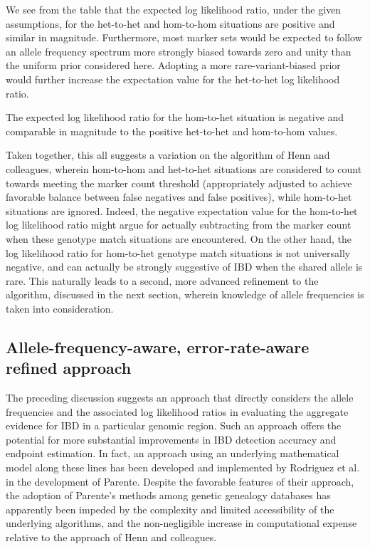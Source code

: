 \documentclass{article}
\begin{document}
We see from the table that the expected log likelihood ratio, under the given assumptions, for the het-to-het and hom-to-hom situations are positive and similar in magnitude. Furthermore, most marker sets would be expected to follow an allele frequency spectrum more strongly biased towards zero and unity than the uniform prior considered here. Adopting a more rare-variant-biased prior would further increase the expectation value for the het-to-het log likelihood ratio.

The expected log likelihood ratio for the hom-to-het situation is negative and comparable in magnitude to the positive het-to-het and hom-to-hom values.

Taken together, this all suggests a variation on the algorithm of Henn and colleagues, wherein hom-to-hom and het-to-het situations are considered to count towards meeting the marker count threshold (appropriately adjusted to achieve favorable balance between false negatives and false positives), while hom-to-het situations are ignored. Indeed, the negative expectation value for the hom-to-het log likelihood ratio might argue for actually subtracting from the marker count when these genotype match situations are encountered. On the other hand, the log likelihood ratio for hom-to-het genotype match situations is not universally negative, and can actually be strongly suggestive of IBD when the shared allele is rare. This naturally leads to a second, more advanced refinement to the algorithm, discussed in the next section, wherein knowledge of allele frequencies is taken into consideration.

\subsection{Allele-frequency-aware, error-rate-aware refined approach}
The preceding discussion suggests an approach that directly considers the allele frequencies and the associated log likelihood ratios in evaluating the aggregate evidence for IBD in a particular genomic region. Such an approach offers the potential for more substantial improvements in IBD detection accuracy and endpoint estimation. In fact, an approach using an underlying mathematical model along these lines has been developed and implemented by Rodriguez et al. in the development of Parente.\citep{Parente} Despite the favorable features of their approach, the adoption of Parente's methods among genetic genealogy databases has apparently been impeded by the complexity and limited accessibility of the underlying algorithms, and the non-negligible increase in computational expense relative to the approach of Henn and colleagues.
\end{document}

